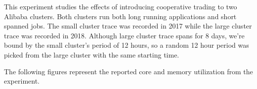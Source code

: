 \begin{center}
\end{center}

This experiment studies the effects of introducing cooperative trading to two
Alibaba clusters. Both clusters run both long running applications and short
spanned jobs. The small cluster trace was recorded in 2017 while the large
cluster trace was recorded in 2018. Although large cluster trace spans for 8
days, we're bound by the small cluster's period of 12 hours, so a random 12
hour period was picked from the large cluster with the same starting time. 

The following figures represent the reported core and memory utilization from
the experiment.

